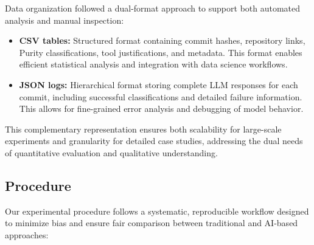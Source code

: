 Data organization followed a dual-format approach to support both automated analysis and manual inspection:
\begin{itemize}
    \item \textbf{CSV tables:} Structured format containing commit hashes, repository links, Purity classifications, tool justifications, and metadata. This format enables efficient statistical analysis and integration with data science workflows.
    \item \textbf{JSON logs:} Hierarchical format storing complete LLM responses for each commit, including successful classifications and detailed failure information. This allows for fine-grained error analysis and debugging of model behavior.
\end{itemize}

This complementary representation ensures both scalability for large-scale experiments and granularity for detailed case studies, addressing the dual needs of quantitative evaluation and qualitative understanding.

\subsection{Procedure}

Our experimental procedure follows a systematic, reproducible workflow designed to minimize bias and ensure fair comparison between traditional and AI-based approaches:

